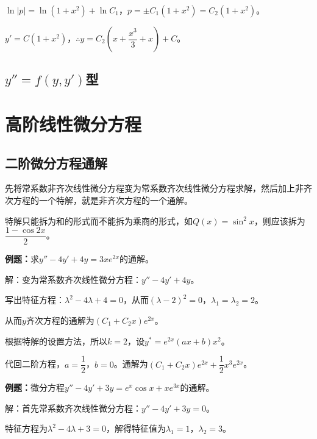 $\ln\vert p\vert=\ln(1+x^2)+\ln C_1$，$p=\pm C_1(1+x^2)=C_2(1+x^2)$。

$y'=C(1+x^2)$，$\therefore y=C_2\left(x+\dfrac{x^3}{3}+x\right)+C$。

\subsection{\texorpdfstring{$y''=f(y,y')$}\ 型}

\section{高阶线性微分方程}



\subsection{二阶微分方程通解}

先将常系数非齐次线性微分方程变为常系数齐次线性微分方程求解，然后加上非齐次方程的一个特解，就是非齐次方程的一个通解。

特解只能拆为和的形式而不能拆为乘商的形式，如$Q(x)=\sin^2x$，则应该拆为$\dfrac{1-\cos2x}{2}$。

\textbf{例题：}求$y''-4y'+4y=3xe^{2x}$的通解。

解：变为常系数齐次线性微分方程：$y''-4y'+4y$。

写出特征方程：$\lambda^2-4\lambda+4=0$，从而$(\lambda-2)^2=0$，$\lambda_1=\lambda_2=2$。

从而$y$齐次方程的通解为$(C_1+C_2x)e^{2x}$。

根据特解的设置方法，所以$k=2$，设$y^*=e^{2x}(ax+b)x^2$。

代回二阶方程，$a=\dfrac{1}{2}$，$b=0$。通解为$(C_1+C_2x)e^{2x}+\dfrac{1}{2}x^3e^{2x}$。

\textbf{例题：}微分方程$y''-4y'+3y=e^x\cos x+xe^{3x}$的通解。

解：首先常系数齐次线性微分方程：$y''-4y'+3y=0$。

特征方程为$\lambda^2-4\lambda+3=0$，解得特征值为$\lambda_1=1$，$\lambda_2=3$。

